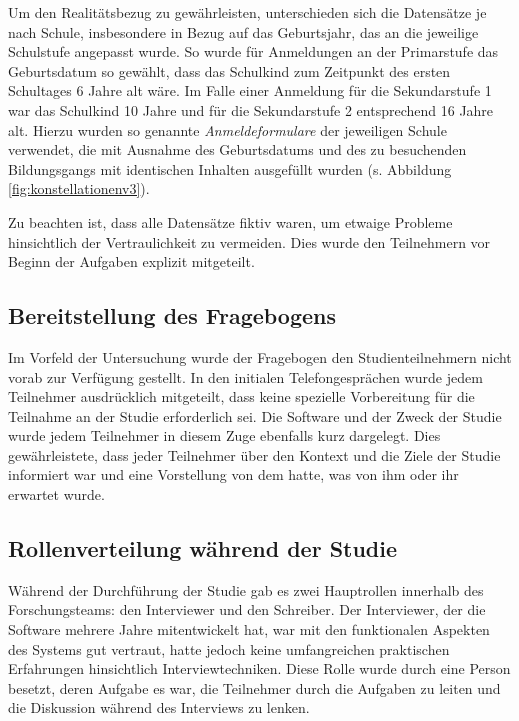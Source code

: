 Um den Realitätsbezug zu gewährleisten, unterschieden sich die Datensätze je nach Schule, insbesondere in Bezug auf das Geburtsjahr, das an die jeweilige Schulstufe angepasst wurde. So wurde für Anmeldungen an der Primarstufe das Geburtsdatum so gewählt, dass das Schulkind zum Zeitpunkt des ersten Schultages 6 Jahre alt wäre. Im Falle einer Anmeldung für die Sekundarstufe 1 war das Schulkind 10 Jahre und für die Sekundarstufe 2 entsprechend 16 Jahre alt.
Hierzu wurden so genannte \textit{Anmeldeformulare} der jeweiligen Schule verwendet, die mit Ausnahme des Geburtsdatums und des zu besuchenden Bildungsgangs mit identischen Inhalten ausgefüllt wurden (s. Abbildung \ref{fig:konstellationenv3}).

Zu beachten ist, dass alle Datensätze fiktiv waren, um etwaige Probleme hinsichtlich der Vertraulichkeit zu vermeiden. Dies wurde den Teilnehmern vor Beginn der Aufgaben explizit mitgeteilt.

\subsection{Bereitstellung des Fragebogens}

Im Vorfeld der Untersuchung wurde der Fragebogen den Studienteilnehmern nicht vorab zur Verfügung gestellt. In den initialen Telefongesprächen wurde jedem Teilnehmer ausdrücklich mitgeteilt, dass keine spezielle Vorbereitung für die Teilnahme an der Studie erforderlich sei. Die Software und der Zweck der Studie wurde jedem Teilnehmer in diesem Zuge ebenfalls kurz dargelegt. Dies gewährleistete, dass jeder Teilnehmer über den Kontext und die Ziele der Studie informiert war und eine Vorstellung von dem hatte, was von ihm oder ihr erwartet wurde.

\subsection{Rollenverteilung während der Studie}

Während der Durchführung der Studie gab es zwei Hauptrollen innerhalb des Forschungsteams: den Interviewer und den Schreiber. Der Interviewer, der die Software mehrere Jahre mitentwickelt hat, war mit den funktionalen Aspekten des Systems gut vertraut, hatte jedoch keine umfangreichen praktischen Erfahrungen hinsichtlich Interviewtechniken. Diese Rolle wurde durch eine Person besetzt, deren Aufgabe es war, die Teilnehmer durch die Aufgaben zu leiten und die Diskussion während des Interviews zu lenken.

